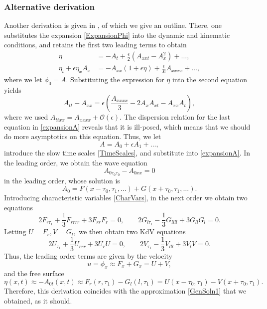 \documentclass[10pt,reqno,oneside,a4paper]{article}
\begin{document}
\begin{appendices}
\subsubsection*{Alternative derivation}
Another derivation is given in \cite[Chapter 5]{ablowitz}, of which we give an outline. There, one substitutes the expansion \eqref{ExpansionPhi} into the dynamic and kinematic conditions, and retains the first two leading terms to obtain
\begin{align*}
\eta &= -A_t + \frac{\epsilon}{2}(A_{xxt} - A_x^2) + \ldots, \\
\eta_t + \epsilon \eta_x A_x &= -A_{xx}(1+ \epsilon \eta) + \frac{\epsilon}{3!}A_{xxxx} + \ldots,
\end{align*}
where we let $\phi_0 = A.$ Substituting the expression for $\eta$ into the second equation yields
\begin{equation}\label{expansionA}
A_{tt} - A_{xx} = \epsilon\left(\frac{A_{xxxx}}{3} - 2A_xA_{xt} - A_{xx}A_t\right), 
\end{equation} 
where we used $A_{ttxx} = A_{xxxx} + \mathcal{O}(\epsilon).$  The dispersion relation for the last equation in \eqref{expansionA} reveals that it is ill-posed, which means that we should do more asymptotics on this equation. Thus, we let
\[ A = A_0 + \epsilon A_1 + \ldots, \]
introduce the slow time scales \eqref{TimeScales}, and substitute into \eqref{expansionA}. In the leading order, we obtain the wave equation
\[ 
A_{0\tau_{0}\tau_{0}} - A_{0xx} = 0
\]
in the leading order, whose solution is 
\[A_0 = F(x - \tau_0, \tau_1, \ldots) + G(x+\tau_0, \tau_1, \ldots).\]
Introducing characteristic variables \eqref{CharVars}, in the next order we obtain two equations 
\[ 
2 F_{r\tau_1} + \frac{1}{3} F_{rrrr} + 3 F_{rr}F_r = 0, \qquad 2 G_{l\tau_1} - \frac{1}{3} G_{llll} + 3 G_{ll}G_l = 0.
\]
Letting $U = F_r, V= G_l,$ we then obtain two KdV equations
\[ 
2 U_{\tau_1} + \frac{1}{3} U_{rrr} + 3 U_{r}U= 0, \qquad 2 V_{\tau_1} - \frac{1}{3} V_{lll} + 3 V_l V = 0.
\]
Thus, the leading order terms are given by the velocity
\[ u = \phi_x \approx F_x + G_x = U+ V, \]
and the free surface 
\[ 
\eta(x,t) \approx -A_{0t}(x,t) \approx F_r(r, \tau_1) - G_l(l, \tau_1) = U(x-\tau_0, \tau_1) - V(x+\tau_0, \tau_1).
\]
Therefore, this derivation coincides with the approximation \eqref{GenSoln1} that we obtained, as it should.
\end{appendices}

{\small}
\end{document}
